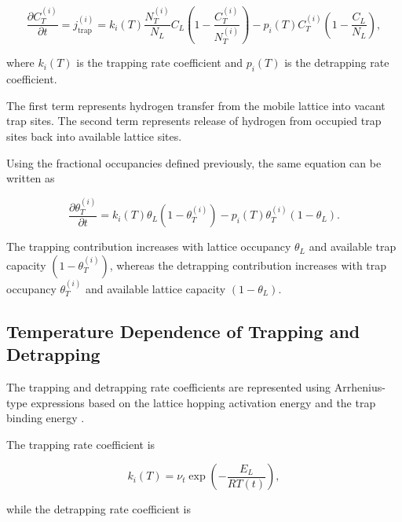 \begin{equation}
\frac{\partial C_T^{(i)}}{\partial t}
=
j_{\mathrm{trap}}^{(i)}
=
k_i(T)
\frac{N_T^{(i)}}{N_L}
C_L
\left(
1-\frac{C_T^{(i)}}{N_T^{(i)}}
\right)
-
p_i(T)
C_T^{(i)}
\left(
1-\frac{C_L}{N_L}
\right),
\label{eq:ch3_mcnabb_molar}
\end{equation}

where $k_i(T)$ is the trapping rate coefficient and $p_i(T)$ is the
detrapping rate coefficient.

The first term represents hydrogen transfer from the mobile lattice
into vacant trap sites. The second term represents release of hydrogen
from occupied trap sites back into available lattice sites.

Using the fractional occupancies defined previously, the same
equation can be written as

\begin{equation}
\frac{\partial \theta_T^{(i)}}{\partial t}
=
k_i(T)\theta_L
\left(1-\theta_T^{(i)}\right)
-
p_i(T)\theta_T^{(i)}
\left(1-\theta_L\right).
\label{eq:ch3_mcnabb_occupancy}
\end{equation}

The trapping contribution increases with lattice occupancy
$\theta_L$ and available trap capacity
$(1-\theta_T^{(i)})$, whereas the detrapping contribution increases
with trap occupancy $\theta_T^{(i)}$ and available lattice capacity
$(1-\theta_L)$.

\subsection{Temperature Dependence of Trapping and Detrapping}
\label{subsec:trapping_detrapping_arrhenius}

The trapping and detrapping rate coefficients are represented using
Arrhenius-type expressions based on the lattice hopping activation
energy and the trap binding energy
\cite{Turnbull1997,Legrand2015,Diaz2020,Marrani2025}.

The trapping rate coefficient is

\begin{equation}
k_i(T)
=
\nu_t
\exp\left(
-\frac{E_L}{RT(t)}
\right),
\label{eq:ch3_arrhenius_ki}
\end{equation}

while the detrapping rate coefficient is

